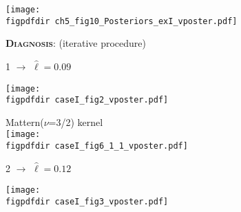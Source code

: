 \documentclass[landscape,a1,final]{a0poster} %
\def\figpdfdir{fig/} %
\begin{document}
\begin{minipage}{1\linewidth}
\begin{minipage}[t]{0.345\textwidth}
\begin{minipage}{0.35\textwidth}
\end{minipage}
\begin{minipage}{0.62\textwidth}
\centering
\texttt{[image: \\figpdfdir ch5\_fig10\_Posteriors\_exI\_vposter.pdf]}
\end{minipage}

\vspace{-0.8cm}
\hspace{-10mm} \textsc{\textbf{\normalsize Diagnosis}}: {\small(iterative procedure)}\\[-18pt]

\hspace{-1cm}
\begin{minipage}[t]{0.48\textwidth}

\begin{minipage}[t]{0.45\textwidth}
{\large 1}\hspace{0.1cm}  $\to$ {\footnotesize$\hat{\ell}=0.09$}

\vspace{0.3cm}
\texttt{[image: \\figpdfdir caseI\_fig2\_vposter.pdf]}

\end{minipage}
\begin{minipage}[t]{0.50\textwidth}
\vspace{-0.5cm}
\hspace{0.25\textwidth}  \tiny Mattern($\nu$=3/2) kernel\\
\texttt{[image: \\figpdfdir caseI\_fig6\_1\_1\_vposter.pdf]}

\end{minipage}

\end{minipage}
\hspace{0.5cm}
\begin{minipage}[t]{0.48\textwidth}

\begin{minipage}[t]{0.45\textwidth}
{\large 2}\hspace{0.1cm}  $\to$ {\footnotesize$\hat{\ell}=0.12$}

\vspace{0.3cm}
\texttt{[image: \\figpdfdir caseI\_fig3\_vposter.pdf]}


\end{minipage}
\end{minipage}
\end{minipage}
\end{minipage}
\end{document}
